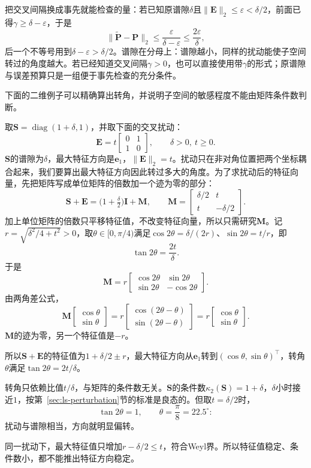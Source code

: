 把交叉间隔换成事先就能检查的量：若已知原谱隙$\delta$且$\lVert\bm E\rVert_2\leq\varepsilon<\delta/2$，前面已得$\gamma\geq\delta-\varepsilon$，于是
\begin{equation}
 \lVert\widetilde{\bm P}-\bm P\rVert_2\leq\frac{\varepsilon}{\delta-\varepsilon}\leq\frac{2\varepsilon}{\delta},
 \label{eq:ls-gap-subspace-budget}
\end{equation}
后一个不等号用到$\delta-\varepsilon>\delta/2$。谱隙在分母上：谱隙越小，同样的扰动能使子空间转过的角度越大。若已经知道交叉间隔$\gamma>0$，也可以直接使用带$\gamma$的形式；原谱隙与误差预算只是一组便于事先检查的充分条件。

下面的二维例子可以精确算出转角，并说明子空间的敏感程度不能由矩阵条件数判断。
\begin{example}[谱隙与特征方向的转角]
\label{ex:ls-gap-direction-rotation}
取$\bm S=\operatorname{diag}(1+\delta,1)$，并取下面的交叉扰动：
\[
 \bm E=t\begin{bmatrix}0&1\\1&0\end{bmatrix},\qquad\delta>0,\ t\geq0 .
\]
$\bm S$的谱隙为$\delta$，最大特征方向是$\bm e_1$，$\lVert\bm E\rVert_2=t$。扰动只在非对角位置把两个坐标耦合起来，我们要算出最大特征方向因此转过多大的角度。为了求扰动后的特征向量，先把矩阵写成单位矩阵的倍数加一个迹为零的部分：
\[
 \bm S+\bm E=\bigl(1+\tfrac\delta2\bigr)\bm I+\bm M,\qquad
 \bm M=\begin{bmatrix}\delta/2&t\\t&-\delta/2\end{bmatrix}.
\]
加上单位矩阵的倍数只平移特征值，不改变特征向量，所以只需研究$\bm M$。记$r=\sqrt{\delta^2/4+t^2}>0$，取$\theta\in[0,\pi/4)$满足$\cos2\theta=\delta/(2r)$、$\sin2\theta=t/r$，即
\[
 \tan2\theta=\frac{2t}{\delta}.
\]
于是
\[
 \bm M=r\begin{bmatrix}\cos2\theta&\sin2\theta\\\sin2\theta&-\cos2\theta\end{bmatrix}.
\]
由两角差公式，
\[
 \bm M\begin{bmatrix}\cos\theta\\\sin\theta\end{bmatrix}
 =r\begin{bmatrix}\cos(2\theta-\theta)\\\sin(2\theta-\theta)\end{bmatrix}
 =r\begin{bmatrix}\cos\theta\\\sin\theta\end{bmatrix}.
\]
$\bm M$的迹为零，另一个特征值是$-r$。

所以$\bm S+\bm E$的特征值为$1+\delta/2\pm r$，最大特征方向从$\bm e_1$转到$(\cos\theta,\sin\theta)^\top$，转角$\theta$满足$\tan2\theta=2t/\delta$。

转角只依赖比值$t/\delta$，与矩阵的条件数无关。$\bm S$的条件数$\kappa_2(\bm S)=1+\delta$，$\delta$小时接近$1$，按第~\ref{sec:ls-perturbation}节的标准是良态的。但取$t=\delta/2$时，
\[
 \tan2\theta=1,\qquad\theta=\frac{\pi}{8}=22.5^\circ :
\]
扰动与谱隙相当，方向就明显偏转。

同一扰动下，最大特征值只增加$r-\delta/2\leq t$，符合Weyl界。所以特征值稳定、条件数小，都不能推出特征方向稳定。
\end{example}
